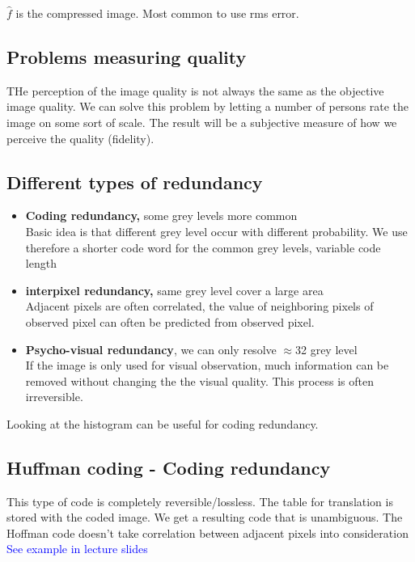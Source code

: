 \begin{wbox}{}
$\hat{f}$ is the compressed image. Most common to use rms error. 
\end{wbox}


\subsection*{Problems measuring quality}
THe perception of the image quality is not always the same as the objective image quality. We can solve this problem by letting a number of persons rate the image on some sort of scale. The result will be a subjective measure of how we perceive the quality (fidelity).

\subsection*{Different types of redundancy}
\begin{itemize}
	\item \textbf{Coding redundancy,} some grey levels more common\\
	Basic idea is that different grey level occur with different probability. We use therefore a shorter code word for the common grey levels, variable code length
	\item \textbf{interpixel redundancy,} same grey level cover a large area \\
	Adjacent pixels are often correlated, the value of neighboring pixels of observed pixel can often be predicted from observed pixel.
	\item \textbf{Psycho-visual redundancy}, we can only resolve $\approx$32 grey level \\
	If the image is only used for visual observation, much information can be removed without changing the the visual quality. This process is often irreversible.
\end{itemize}

\begin{wbox}{}
Looking at the histogram can be useful for coding redundancy.
\end{wbox}


\subsection*{Huffman coding - Coding redundancy}
This type of code is completely reversible/lossless. The table for translation is stored with the coded image. We get a resulting code that is unambiguous. The Hoffman code doesn't take correlation between adjacent pixels into consideration \textcolor{blue}{See example in lecture slides} 


